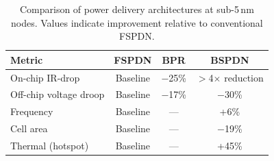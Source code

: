 \begin{table}[h]
\centering
\caption{Comparison of power delivery architectures at sub-5\,nm nodes. Values indicate improvement relative to conventional FSPDN.}
\label{tab:comparison}
\begin{tabular}{|l|c|c|c|}
\hline
\textbf{Metric} & \textbf{FSPDN} & \textbf{BPR} & \textbf{BSPDN} \\
\hline
On-chip IR-drop & Baseline & $-$25\%\cite{9817394} & $>$4$\times$ reduction\cite{8932458} \\
\hline
Off-chip voltage droop & Baseline & $-$17\%\cite{9817394} & $-$30\%\cite{10185208} \\
\hline
Frequency & Baseline & --- & +6\%\cite{10185208} \\
\hline
Cell area & Baseline & --- & $-$19\%\cite{10631463} \\
\hline
Thermal (hotspot) & Baseline & --- & +45\%\cite{10925422} \\
\hline
\end{tabular}
\end{table}